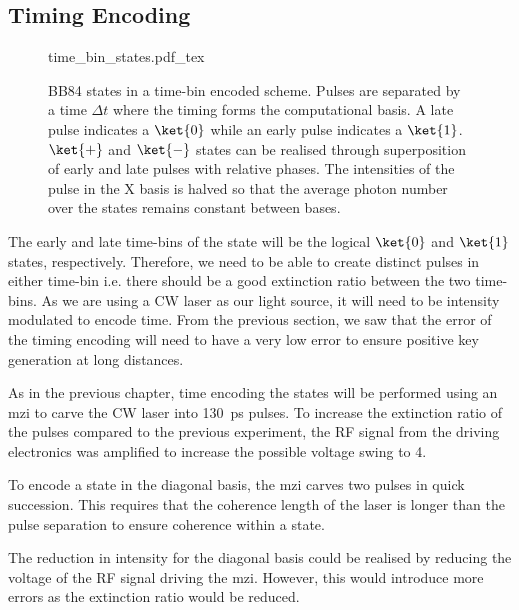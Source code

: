 \subsection{Timing Encoding}

\begin{figure}[t]
	\centering
	\small
	\def\svgwidth{0.9\textwidth} 
	{time_bin_states.pdf_tex}
	\caption[BB84 time-bin encoding]{BB84 states in a time-bin encoded scheme. Pulses are separated by a time $\Delta t$ where the timing forms the computational basis. A late pulse indicates a $\ket{0}$ while an early pulse indicates a $\ket{1}$. $\ket{+}$ and $\ket{-}$ states can be realised through superposition of early and late pulses with relative phases. The intensities of the pulse in the X basis is halved so that the average photon number over the states remains constant between bases.}
	\label{fig:BB84_time_bin}
\end{figure}

The early and late time-bins of the state will be the logical $\ket{0}$ and $\ket{1}$ states, respectively. Therefore, we need to be able to create distinct pulses in either time-bin i.e. there should be a good extinction ratio between the two time-bins. As we are using a \ac{CW} laser as our light source, it will need to be intensity modulated to encode time. From the previous section, we saw that the error of the timing encoding will need to have a very low error to ensure positive key generation at long distances.

As in the previous chapter, time encoding the states will be performed using an \acl{mzi} to carve the \ac{CW} laser into \SI{130}{ps} pulses. To increase the extinction ratio of the pulses compared to the previous experiment, the RF signal from the driving electronics was amplified to increase the possible voltage swing to \SI{4}{\Vpp}. 


To encode a state in the diagonal basis, the \ac{mzi} carves two pulses in quick succession. This requires that the coherence length of the laser is longer than the pulse separation to ensure coherence within a state. 

The reduction in intensity for the diagonal basis could be realised by reducing the voltage of the RF signal driving the \ac{mzi}. However, this would introduce more errors as the extinction ratio would be reduced.

